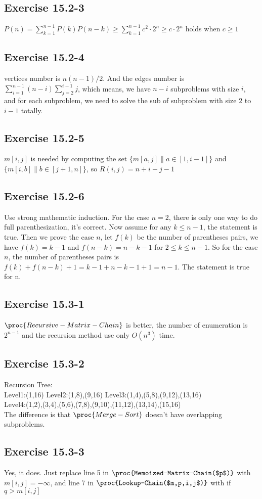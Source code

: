 \documentclass[12pt]{article}
\theoremstyle{definition}
\theoremstyle{remark}
\begin{document}
\subsection*{Exercise 15.2-3}
$P(n)=\sum_{k=1}^{n-1}P(k)P(n-k)\ge \sum_{k=1}^{n-1}c^2\cdot 2^n\ge c\cdot 2^n$ holds when $c\ge 1$
\subsection*{Exercise 15.2-4}
vertices number is $n(n-1)/2$. And the edges number is $\sum_{i=1}^{n-1}(n-i)\sum_{j=2}^{i-1}j$, which means, we have $n-i$ subproblems with size $i$, and for each subproblem, we need to solve the sub of subproblem with size $2$ to $i-1$ totally.
\subsection*{Exercise 15.2-5}
$m[i,j]$ is needed by computing the set $\{m[a,j]\|a\in[1,i-1]\}$ and $\{m[i,b]\|b\in[j+1,n]\}$, so $R(i,j)=n+i-j-1$
\subsection*{Exercise 15.2-6}
Use strong mathematic induction. For the case $n=2$, there is only one way to do full parenthesization, it's correct. Now assume for any $k\le n-1$, the statement is true. Then we prove the case $n$, let $f(k)$ be the number of parentheses pairs, we have $f(k)=k-1$ and $f(n-k)=n-k-1$ for $2\le k\le n-1$. So for the case $n$, the number of parentheses pairs is $f(k)+f(n-k)+1=k-1+n-k-1+1=n-1$. The statement is true for n.
\subsection*{Exercise 15.3-1}
$\proc{Recursive-Matrix-Chain}$ is better, the number of enumeration is $2^{n-1}$ and the recursion method use only $O(n^3)$ time.
\subsection*{Exercise 15.3-2}
Recursion Tree:\\
Level1:(1,16) Level2:(1,8),(9,16) Level3:(1,4),(5,8),(9,12),(13,16)\\
Level4:(1,2),(3,4),(5,6),(7,8),(9,10),(11,12),(13,14),(15,16)\\
The difference is that $\proc{Merge-Sort}$ doesn't have overlapping subproblems.
\subsection*{Exercise 15.3-3}
Yes, it does. Just replace line 5 in $\proc{Memoized-Matrix-Chain($p$)}$ with $m[i,j]=-\infty$, and line 7 in $\proc{Lookup-Chain($m,p,i,j$)}$ with if $q > m[i,j]$
\end{document}
